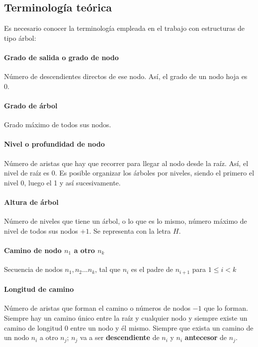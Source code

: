 \documentclass[a4paper, 11pt, titlepage]{article}
\begin{document}
    \subsection{Terminología teórica}

        Es necesario conocer la terminología empleada en el trabajo con estructuras de tipo 
        árbol:

        \paragraph{Grado de salida o grado de nodo} Número de descendientes directos de ese nodo.
         Así, el grado de un nodo hoja es 0.
        \paragraph{Grado de árbol} Grado máximo de todos sus nodos.
        \paragraph{Nivel o profundidad de nodo} Número de aristas que hay que recorrer para
        llegar al nodo desde la raíz. Así, el nivel de raíz es 0. Es posible organizar los árboles por 
        niveles, siendo el primero el nivel 0, luego el 1 y así sucesivamente.
        \paragraph{Altura de árbol} Número de niveles que tiene un árbol, o lo que es lo mismo, 
        número máximo de nivel de todos sus nodos $+1$. Se representa con la letra $H$.
        \paragraph{Camino de nodo $n_1$ a otro $n_k$} Secuencia de nodos $n_1, n_2 ... n_k$, 
        tal que $n_i$ es el padre de $n_{i+1}$ para $1\leq  i < k$
        \paragraph{Longitud de camino} Número de aristas que forman el camino o números de nodos 
        $-1$ que lo forman. Siempre hay un camino único entre la raíz y cualquier nodo y siempre existe 
        un camino de longitud 0 entre un nodo y él mismo. Siempre que exista un camino de un nodo
        $n_i$ a otro $n_j$; $n_j$ va a ser \textbf{descendiente} de $n_i$ y $n_i$ \textbf{antecesor}
        de $n_j$.
\end{document}
